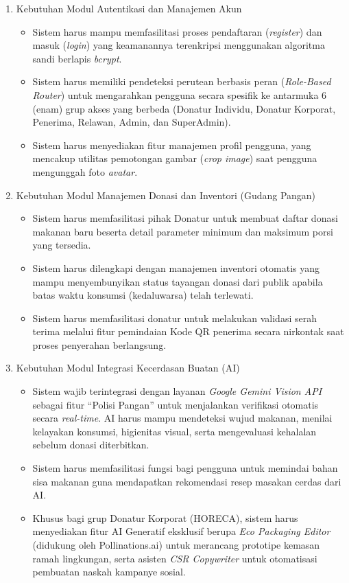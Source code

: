 \begin{enumerate}
    \item Kebutuhan Modul Autentikasi dan Manajemen Akun
    \begin{itemize}
        \item Sistem harus mampu memfasilitasi proses pendaftaran (\textit{register}) dan masuk (\textit{login}) yang keamanannya terenkripsi menggunakan algoritma sandi berlapis \textit{bcrypt}.
        \item Sistem harus memiliki pendeteksi perutean berbasis peran (\textit{Role-Based Router}) untuk mengarahkan pengguna secara spesifik ke antarmuka 6 (enam) grup akses yang berbeda (Donatur Individu, Donatur Korporat, Penerima, Relawan, Admin, dan SuperAdmin).
        \item Sistem harus menyediakan fitur manajemen profil pengguna, yang mencakup utilitas pemotongan gambar (\textit{crop image}) saat pengguna mengunggah foto \textit{avatar}.
    \end{itemize}

    \item Kebutuhan Modul Manajemen Donasi dan Inventori (Gudang Pangan)
    \begin{itemize}
        \item Sistem harus memfasilitasi pihak Donatur untuk membuat daftar donasi makanan baru beserta detail parameter minimum dan maksimum porsi yang tersedia.
        \item Sistem harus dilengkapi dengan manajemen inventori otomatis yang mampu menyembunyikan status tayangan donasi dari publik apabila batas waktu konsumsi (kedaluwarsa) telah terlewati.
        \item Sistem harus memfasilitasi donatur untuk melakukan validasi serah terima melalui fitur pemindaian Kode QR penerima secara nirkontak saat proses penyerahan berlangsung.
    \end{itemize}

    \item Kebutuhan Modul Integrasi Kecerdasan Buatan (AI)
    \begin{itemize}
        \item Sistem wajib terintegrasi dengan layanan \textit{Google Gemini Vision API} sebagai fitur ``Polisi Pangan'' untuk menjalankan verifikasi otomatis secara \textit{real-time}. AI harus mampu mendeteksi wujud makanan, menilai kelayakan konsumsi, higienitas visual, serta mengevaluasi kehalalan sebelum donasi diterbitkan.
        \item Sistem harus memfasilitasi fungsi bagi pengguna untuk memindai bahan sisa makanan guna mendapatkan rekomendasi resep masakan cerdas dari AI.
        \item Khusus bagi grup Donatur Korporat (HORECA), sistem harus menyediakan fitur AI Generatif eksklusif berupa \textit{Eco Packaging Editor} (didukung oleh Pollinations.ai) untuk merancang prototipe kemasan ramah lingkungan, serta asisten \textit{CSR Copywriter} untuk otomatisasi pembuatan naskah kampanye sosial.
    \end{itemize}


\end{enumerate}
